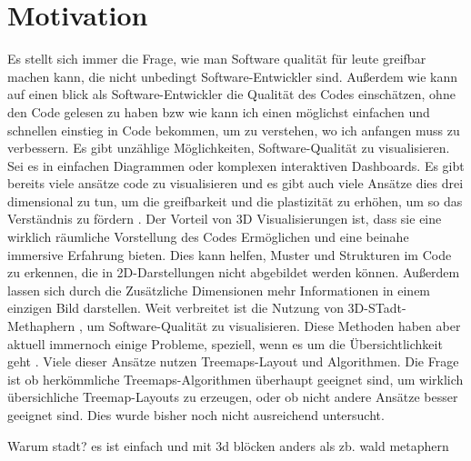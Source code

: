 \section{Motivation} \label{sec:Motivation}
Es stellt sich immer die Frage, wie man Software qualität für leute greifbar machen kann, die nicht unbedingt Software-Entwickler sind. Außerdem wie kann auf einen blick als Software-Entwickler die Qualität des Codes einschätzen, ohne den Code gelesen zu haben bzw wie kann ich einen möglichst einfachen und schnellen einstieg in Code bekommen, um zu verstehen, wo ich anfangen muss zu verbessern.
Es gibt unzählige Möglichkeiten, Software-Qualität zu visualisieren. Sei es in einfachen Diagrammen oder komplexen interaktiven Dashboards. 
Es gibt bereits viele ansätze code zu visualisieren und es gibt auch viele Ansätze dies drei dimensional zu tun, um die greifbarkeit und die plastizität zu erhöhen, um so das Verständnis zu fördern \cite{3dsoftwareMarcus,codeCity1,first_3D_vis,virtualButVisibleMunro}. 
Der Vorteil von 3D Visualisierungen ist, dass sie eine wirklich räumliche Vorstellung des Codes Ermöglichen und eine beinahe immersive Erfahrung bieten. Dies kann helfen, Muster und Strukturen im Code zu erkennen, die in 2D-Darstellungen nicht abgebildet werden können. Außerdem lassen sich durch die Zusätzliche Dimensionen mehr Informationen in einem einzigen Bild darstellen.
Weit verbreitet ist die Nutzung von 3D-STadt-Methaphern \cite{codeCity1}, um Software-Qualität zu visualisieren. Diese Methoden haben aber aktuell immernoch einige Probleme, speziell, wenn es um die Übersichtlichkeit geht \cite{lu2008cascaded}. Viele dieser Ansätze nutzen Treemaps-Layout und Algorithmen. Die Frage ist ob herkömmliche Treemaps-Algorithmen überhaupt geeignet sind, um wirklich übersichliche Treemap-Layouts zu erzeugen, oder ob nicht andere Ansätze besser geeignet sind. Dies wurde bisher noch nicht ausreichend untersucht.




Warum stadt? es ist einfach und mit 3d blöcken anders als zb. wald metaphern\cite{softwareForest}